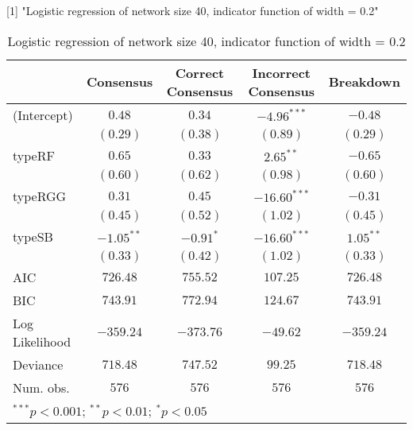 [1] "Logistic regression of network size 40, indicator function of width = 0.2"

\begin{table}
\begin{center}
\begin{tabular}{l c c c c}
\toprule
 & Consensus & Correct Consensus & Incorrect Consensus & Breakdown \\
\midrule
(Intercept)    & $0.48$       & $0.34$      & $-4.96^{***}$  & $-0.48$     \\
               & $(0.29)$     & $(0.38)$    & $(0.89)$       & $(0.29)$    \\
typeRF         & $0.65$       & $0.33$      & $2.65^{**}$    & $-0.65$     \\
               & $(0.60)$     & $(0.62)$    & $(0.98)$       & $(0.60)$    \\
typeRGG        & $0.31$       & $0.45$      & $-16.60^{***}$ & $-0.31$     \\
               & $(0.45)$     & $(0.52)$    & $(1.02)$       & $(0.45)$    \\
typeSB         & $-1.05^{**}$ & $-0.91^{*}$ & $-16.60^{***}$ & $1.05^{**}$ \\
               & $(0.33)$     & $(0.42)$    & $(1.02)$       & $(0.33)$    \\
\midrule
AIC            & $726.48$     & $755.52$    & $107.25$       & $726.48$    \\
BIC            & $743.91$     & $772.94$    & $124.67$       & $743.91$    \\
Log Likelihood & $-359.24$    & $-373.76$   & $-49.62$       & $-359.24$   \\
Deviance       & $718.48$     & $747.52$    & $99.25$        & $718.48$    \\
Num. obs.      & $576$        & $576$       & $576$          & $576$       \\
\bottomrule
\multicolumn{5}{l}{\scriptsize{$^{***}p<0.001$; $^{**}p<0.01$; $^{*}p<0.05$}}
\end{tabular}
\caption{Logistic regression of network size 40, indicator function of width = 0.2}
\label{table:coefficients}
\end{center}
\end{table}
